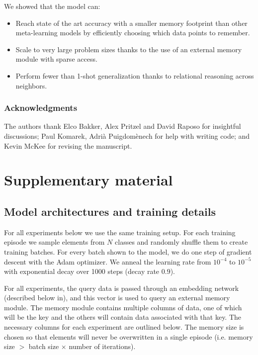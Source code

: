 \documentclass{article} \usepackage{iclr2019_conference,times}
\begin{document}
We showed that the model can:
\begin{itemize}
    \item Reach state of the art accuracy with a smaller memory footprint than other meta-learning models by efficiently choosing which data points to remember.
    \item Scale to very large problem sizes thanks to the use of an external memory module with sparse access.
    \item Perform fewer than 1-shot generalization thanks to relational reasoning across neighbors.
\end{itemize}

\subsubsection*{Acknowledgments}
The authors thank Elco Bakker, Alex Pritzel and David Raposo for insightful discussions; Paul Komarek, Adrià Puigdomènech for help with writing code; and Kevin McKee for revising the manuscript.




\newpage
\section{Supplementary material}

\subsection{Model architectures and training details}

For all experiments below we use the same training setup. For each training episode we sample elements from $N$ classes and randomly shuffle them to create training batches. For every batch shown to the model, we do one step of gradient descent with the Adam optimizer. We anneal the learning rate from $10^{-4}$ to $10^{-5}$ with exponential decay over 1000 steps (decay rate $0.9$).

For all experiments, the query data is passed through an embedding network (described below in), and this vector is used to query an external memory module. The memory module contains multiple columns of data, one of which will be the key and the others will contain data associated with that key. The necessary columns for each experiment are outlined below. The memory size is chosen so that elements will never be overwritten in a single episode (i.e. memory size $>$ batch size $\times$ number of iterations).
\end{document}
